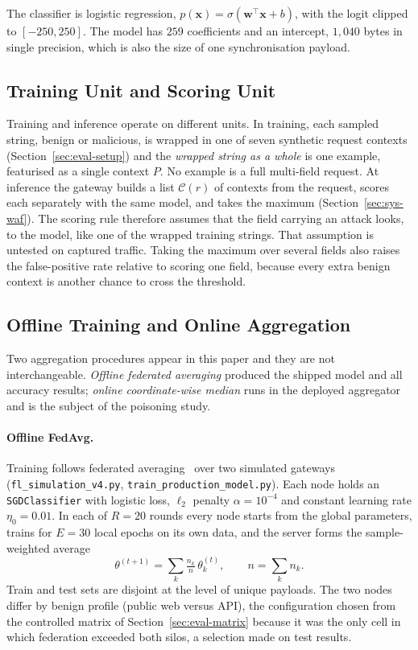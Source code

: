 The classifier is logistic regression, $p(\mathbf{x})=\sigma(\mathbf{w}^\top\mathbf{x}+b)$, with the logit clipped to $[-250,250]$. The model has $259$ coefficients and an intercept, $1{,}040$ bytes in single precision, which is also the size of one synchronisation payload.

\subsection{Training Unit and Scoring Unit}
\label{sec:sys-units}
Training and inference operate on different units. In training, each sampled string, benign or malicious, is wrapped in one of seven synthetic request contexts (Section~\ref{sec:eval-setup}) and the \emph{wrapped string as a whole} is one example, featurised as a single context $P$. No example is a full multi-field request. At inference the gateway builds a list $\mathcal{C}(r)$ of contexts from the request, scores each separately with the same model, and takes the maximum (Section~\ref{sec:sys-waf}). The scoring rule therefore assumes that the field carrying an attack looks, to the model, like one of the wrapped training strings. That assumption is untested on captured traffic. Taking the maximum over several fields also raises the false-positive rate relative to scoring one field, because every extra benign context is another chance to cross the threshold.

\subsection{Offline Training and Online Aggregation}
\label{sec:sys-agg}
Two aggregation procedures appear in this paper and they are not interchangeable. \emph{Offline federated averaging} produced the shipped model and all accuracy results; \emph{online coordinate-wise median} runs in the deployed aggregator and is the subject of the poisoning study.

\paragraph{Offline FedAvg.}
Training follows federated averaging~\cite{mcmahan2017} over two simulated gateways (\texttt{fl\_simulation\_v4.py}, \texttt{train\_production\_model.py}). Each node holds an \texttt{SGDClassifier} with logistic loss, $\ell_2$ penalty $\alpha=10^{-4}$ and constant learning rate $\eta_0=0.01$. In each of $R=20$ rounds every node starts from the global parameters, trains for $E=30$ local epochs on its own data, and the server forms the sample-weighted average
\begin{equation}
\theta^{(t+1)} = \sum_k \tfrac{n_k}{n}\,\theta_k^{(t)}, \qquad n=\sum_k n_k .
\end{equation}
Train and test sets are disjoint at the level of unique payloads. The two nodes differ by benign profile (public web versus API), the configuration chosen from the controlled matrix of Section~\ref{sec:eval-matrix} because it was the only cell in which federation exceeded both silos, a selection made on test results.

